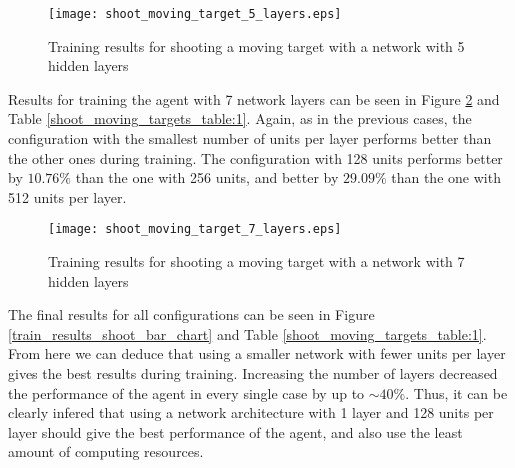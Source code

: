 \begin{figure}
    \begin{center}
        \texttt{[image: shoot\_moving\_target\_5\_layers.eps]}
        \caption{Training results for shooting a moving target with a network with 5 hidden layers}
        \label{train_results_shoot_5_layers}
    \end{center}
\end{figure}

Results for training the agent with 7 network layers can be seen in Figure \ref{train_results_shoot_7_layers} and Table \ref{shoot_moving_targets_table:1}. Again, as in the previous cases, the configuration with the smallest number of units per layer performs better than the other ones during training. The configuration with 128 units performs better by $10.76\%$ than the one with 256 units, and better by $29.09\%$ than the one with 512 units per layer.

\begin{figure}
    \begin{center}
        \texttt{[image: shoot\_moving\_target\_7\_layers.eps]}
        \caption{Training results for shooting a moving target with a network with 7 hidden layers}
        \label{train_results_shoot_7_layers}
    \end{center}
\end{figure}

The final results for all configurations can be seen in Figure \ref{train_results_shoot_bar_chart} and Table \ref{shoot_moving_targets_table:1}. From here we can deduce that using a smaller network with fewer units per layer gives the best results during training. Increasing the number of layers decreased the performance of the agent in every single case by up to $\sim40\%$. Thus, it can be clearly infered that using a network architecture with 1 layer and 128 units per layer should give the best performance of the agent, and also use the least amount of computing resources.

